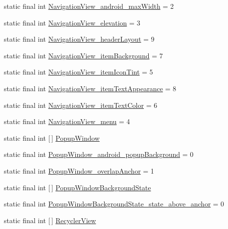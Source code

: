 \begin{DoxyCompactItemize}
static final int \hyperlink{classproject4_1_1xaria_1_1R_1_1styleable_a5a8dc1c5c2c90070efa716ca76e55965}{Navigation\+View\+\_\+android\+\_\+max\+Width} = 2
\item 
static final int \hyperlink{classproject4_1_1xaria_1_1R_1_1styleable_a40197d42f2fce56d33d3778b865afb7d}{Navigation\+View\+\_\+elevation} = 3
\item 
static final int \hyperlink{classproject4_1_1xaria_1_1R_1_1styleable_aba1cb9b91f8ee6dffd022b886c737544}{Navigation\+View\+\_\+header\+Layout} = 9
\item 
static final int \hyperlink{classproject4_1_1xaria_1_1R_1_1styleable_a55510ee8cd624d814f16034b63474168}{Navigation\+View\+\_\+item\+Background} = 7
\item 
static final int \hyperlink{classproject4_1_1xaria_1_1R_1_1styleable_a205b41948506e966136578f28f200761}{Navigation\+View\+\_\+item\+Icon\+Tint} = 5
\item 
static final int \hyperlink{classproject4_1_1xaria_1_1R_1_1styleable_ac1468f6b443ff3dac67ce32e0eca086f}{Navigation\+View\+\_\+item\+Text\+Appearance} = 8
\item 
static final int \hyperlink{classproject4_1_1xaria_1_1R_1_1styleable_ae7444d646194867fa565bbf74485b80f}{Navigation\+View\+\_\+item\+Text\+Color} = 6
\item 
static final int \hyperlink{classproject4_1_1xaria_1_1R_1_1styleable_a022d160eabbea5a2a77ffa237987cbe8}{Navigation\+View\+\_\+menu} = 4
\item 
static final int \mbox{[}$\,$\mbox{]} \hyperlink{classproject4_1_1xaria_1_1R_1_1styleable_a55b1ea3ea17bd2c0ca0038ad45c86e31}{Popup\+Window}
\item 
static final int \hyperlink{classproject4_1_1xaria_1_1R_1_1styleable_a6b38610b172bbd2b9759f5aec018238a}{Popup\+Window\+\_\+android\+\_\+popup\+Background} = 0
\item 
static final int \hyperlink{classproject4_1_1xaria_1_1R_1_1styleable_acfb6ddfbcd2513d18991d64cf7f6f54d}{Popup\+Window\+\_\+overlap\+Anchor} = 1
\item 
static final int \mbox{[}$\,$\mbox{]} \hyperlink{classproject4_1_1xaria_1_1R_1_1styleable_a00ba6404cc13671fe72e09b01c9d644f}{Popup\+Window\+Background\+State}
\item 
static final int \hyperlink{classproject4_1_1xaria_1_1R_1_1styleable_a2a8ab4a40132dc965599968290b3b84d}{Popup\+Window\+Background\+State\+\_\+state\+\_\+above\+\_\+anchor} = 0
\item 
static final int \mbox{[}$\,$\mbox{]} \hyperlink{classproject4_1_1xaria_1_1R_1_1styleable_ad70c99b52204a6206f85345454bda20d}{Recycler\+View}

\end{DoxyCompactItemize}
